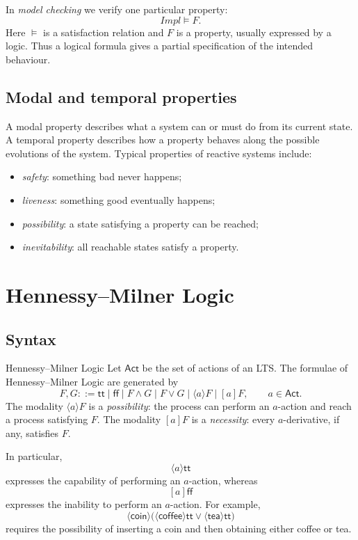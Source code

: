 \documentclass[a4paper]{article}
\newcommand{\Act}{\mathsf{Act}}
\newcommand{\ttt}{\mathsf{tt}}
\newcommand{\fff}{\mathsf{ff}}
\begin{document}
In \emph{model checking} we verify one particular property:
\[
    \mathit{Impl} \models F.
\]
Here \(\models\) is a satisfaction relation and \(F\) is a property, usually expressed by a logic.
Thus a logical formula gives a partial specification of the intended behaviour.

\subsection{Modal and temporal properties}

A modal property describes what a system can or must do from its current state.
A temporal property describes how a property behaves along the possible evolutions of the system.
Typical properties of reactive systems include:
\begin{itemize}
    \item \emph{safety}: something bad never happens;
    \item \emph{liveness}: something good eventually happens;
    \item \emph{possibility}: a state satisfying a property can be reached;
    \item \emph{inevitability}: all reachable states satisfy a property.
\end{itemize}

\section{Hennessy--Milner Logic}

\subsection{Syntax}

\begin{snippetdefinition}{Hennessy--Milner Logic}
    Let \(\Act\) be the set of actions of an LTS.
    The formulae of Hennessy--Milner Logic are generated by
    \[
        F,G ::= \ttt \mid \fff \mid F\land G \mid F\lor G
        \mid \langle a\rangle F \mid [a]F,
        \qquad a\in\Act.
    \]
    The modality \(\langle a\rangle F\) is a \emph{possibility}: the process can perform an \(a\)-action and reach a process satisfying \(F\).
    The modality \([a]F\) is a \emph{necessity}: every \(a\)-derivative, if any, satisfies \(F\).
\end{snippetdefinition}

In particular,
\[
    \langle a\rangle\ttt
\]
expresses the capability of performing an \(a\)-action, whereas
\[
    [a]\fff
\]
expresses the inability to perform an \(a\)-action.
For example,
\[
    \langle\mathsf{coin}\rangle
    \bigl(\langle\mathsf{coffee}\rangle\ttt
    \lor \langle\mathsf{tea}\rangle\ttt\bigr)
\]
requires the possibility of inserting a coin and then obtaining either coffee or tea.
\end{document}
